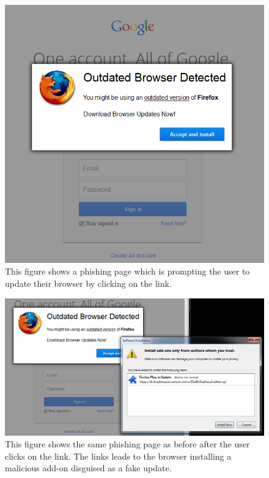 \begin{figure}[p]
\centering
    \includegraphics[width=1.0\textwidth]{ff2.png}
    \caption{This figure shows a phishing page which is prompting the user to update their browser by clicking on the link.}
   \label{fig:fakeprompt-1}
\end{figure}
\begin{figure}[p]
\centering
    \includegraphics[width=1.0\textwidth]{ff-addon1.png}
    \caption{This figure shows the same phishing page as before after the user clicks on the link. The links leads to the browser installing a malicious add-on disguised as a fake update.}
   \label{fig:fakeprompt-2}
\end{figure}

